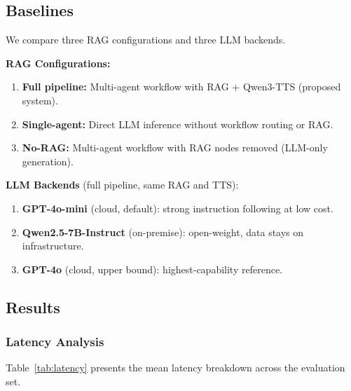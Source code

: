 \documentclass[10pt, a4paper, twocolumn]{article}
\begin{document}
\subsection{Baselines}

We compare three RAG configurations and three LLM backends.

\noindent\textbf{RAG Configurations:}
\begin{enumerate}[label=(\alph*), nosep]
    \item \textbf{Full pipeline:} Multi-agent workflow with RAG + Qwen3-TTS (proposed system).
    \item \textbf{Single-agent:} Direct LLM inference without workflow routing or RAG.
    \item \textbf{No-RAG:} Multi-agent workflow with RAG nodes removed (LLM-only generation).
\end{enumerate}

\noindent\textbf{LLM Backends} (full pipeline, same RAG and TTS):
\begin{enumerate}[label=(\roman*), nosep]
    \item \textbf{GPT-4o-mini} (cloud, default): strong instruction following at low cost.
    \item \textbf{Qwen2.5-7B-Instruct} (on-premise): open-weight, data stays on infrastructure.
    \item \textbf{GPT-4o} (cloud, upper bound): highest-capability reference.
\end{enumerate}

\subsection{Results}

\subsubsection{Latency Analysis}

Table~\ref{tab:latency} presents the mean latency breakdown across the evaluation set.

\begin{table}[t]
    \centering
    \caption{Mean latency breakdown (seconds) across 50 evaluation queries. $t_\text{ret}$ and $t_\text{LLM}$ are sub-components of orchestration; $t_\text{TTS}$ is measured to first sentence playback.}
    \label{tab:latency}
    \small
\end{table}
\end{document}
